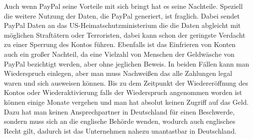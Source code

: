 Auch wenn PayPal seine Vorteile mit sich bringt hat es seine Nachteile. Speziell die weitere Nutzung der Daten, die PayPal generiert, ist fraglich. Dabei sendet PayPal Daten an das US-Heimatschutzministerium die die Daten abgleicht mit möglichen Straftätern oder Terroristen, dabei kann schon der geringste Verdacht zu einer Sperrung des Kontos führen. %
Ebenfalls ist das Einfrieren von Konten auch ein großer Nachteil, da eine Vielzahl von Menschen der Geldwäsche von PayPal bezichtigt werden, aber ohne jeglichen Beweis. In beiden Fällen kann man Wiederspruch einlegen, aber man muss Nachweißen das alle Zahlungen legal waren und sich ausweisen können. Bis zu dem Zeitpunkt der Wiedereröffnung des Kontos oder Wiederaktivierung falls der Wiederspruch angenommen worden ist können einige Monate vergehen und man hat absolut keinen Zugriff auf das Geld. Dazu hat man keinen Ansprechpartner in Deutschland für einen Beschwerde, sondern muss sich an die englische Behörde wenden, wodurch auch englisches Recht gilt, dadurch ist das Unternehmen nahezu unantastbar in Deutschland. 
